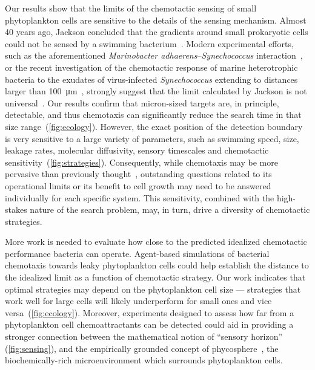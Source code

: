 \documentclass[9pt,twocolumn,twoside]{pnas-new}
\begin{document}
Our results show that the limits of the chemotactic sensing of small phytoplankton cells are sensitive to the details of the sensing mechanism. Almost 40 years ago, Jackson concluded that the gradients around small prokaryotic cells could not be sensed by a swimming bacterium~\cite{jackson1987simulating}. Modern experimental efforts, such as the aforementioned \textit{Marinobacter adhaerens}--\textit{Synechococcus} interaction~\cite{raina2023chemotaxis}, or the recent investigation of the chemotactic response of marine heterotrophic bacteria to the exudates of virus-infected \textit{Synechococcus} extending to distances larger than \SI{100}{\micro\m}~\cite{henshaw2023early}, strongly suggest that the limit calculated by Jackson is not universal~\cite{seymour2024swimming}. Our results confirm that micron-sized targets are, in principle, detectable, and thus chemotaxis can significantly reduce the search time in that size range~(\autoref{fig:ecology}). However, the exact position of the detection boundary is very sensitive to a large variety of parameters, such as swimming speed, size, leakage rates, molecular diffusivity, sensory timescales and chemotactic sensitivity~(\autoref{fig:strategies}). Consequently, while chemotaxis may be more pervasive than previously thought~\cite{seymour2024swimming}, outstanding questions related to its operational limits or its benefit to cell growth may need to be answered individually for each specific system. This sensitivity, combined with the high-stakes nature of the search problem, may, in turn, drive a diversity of chemotactic strategies.


More work is needed to evaluate how close to the predicted idealized chemotactic performance bacteria can operate. Agent-based simulations of bacterial chemotaxis towards leaky phytoplankton cells could help establish the distance to the idealized limit as a function of chemotactic strategy. Our work indicates that optimal strategies may depend on the phytoplankton cell size --- strategies that work well for large cells will likely underperform for small ones and vice versa~(\autoref{fig:ecology}). Moreover, experiments designed to assess how far from a phytoplankton cell chemoattractants can be detected could aid in providing a stronger connection between the mathematical notion of ``sensory horizon'' (\autoref{fig:sensing}), and the empirically grounded concept of phycosphere~\cite{seymour2017zooming,bell1972chemotactic,platt2023probing}, the biochemically-rich microenvironment which surrounds phytoplankton cells.
\end{document}
